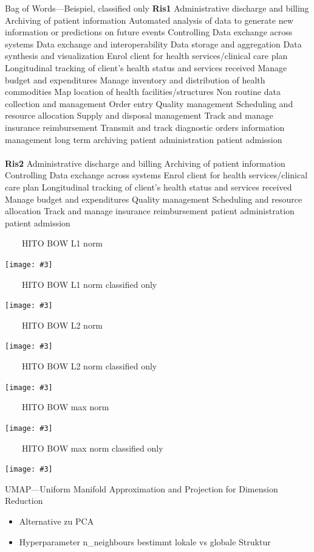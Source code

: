 \documentclass[aspectratio=1610,handout]{beamer}
\newcommand{\imageslide}[4][]
{
\begin{frame}[plain]{~~~~#2}
\vspace{0.2em}
\begin{center}
\centering\texttt{[image: \#3]}
\end{center}
#1
\note{#4}
\end{frame}
}
\begin{document}
\begin{frame}{Bag of Words---Beispiel, classified only}
\small
\textbf{Ris1} Administrative discharge and billing Archiving of patient information Automated analysis of data to generate new information or predictions on future events Controlling Data exchange across systems Data exchange and interoperability Data storage and aggregation Data synthesis and visualization Enrol client for health services/clinical care plan Longitudinal tracking of client’s health status and services received Manage budget and expenditures Manage inventory and distribution of health commodities Map location of health facilities/structures Non routine data collection and management Order entry Quality management Scheduling and resource allocation Supply and disposal management Track and manage insurance reimbursement Transmit and track diagnostic orders information management long term archiving patient administration patient admission
\\~\\
\textbf{Ris2} Administrative discharge and billing Archiving of patient information Controlling Data exchange across systems Enrol client for health services/clinical care plan Longitudinal tracking of client’s health status and services received Manage budget and expenditures Quality management Scheduling and resource allocation Track and manage insurance reimbursement patient administration patient admission
\end{frame}

\imageslide{HITO BOW L1 norm}{img/cluster-bagofwords-l1.pdf}{}
\imageslide{HITO BOW L1 norm classified only}{img/cluster-bagofwords-classifiedonly-l1.pdf}{}
\imageslide{HITO BOW L2 norm}{img/cluster-bagofwords-l2.pdf}{}
\imageslide{HITO BOW L2 norm classified only}{img/cluster-bagofwords-classifiedonly-l2.pdf}{}
\imageslide{HITO BOW max norm}{img/cluster-bagofwords-max.pdf}{}
\imageslide{HITO BOW max norm classified only}{img/cluster-bagofwords-classifiedonly-max.pdf}{}

\begin{frame}{UMAP---Uniform Manifold Approximation and Projection for Dimension Reduction}
\begin{itemize}
\item Alternative zu PCA
\item Hyperparameter n\_neighbours bestimmt lokale vs globale Struktur
\end{itemize}
\end{frame}
\end{document}
